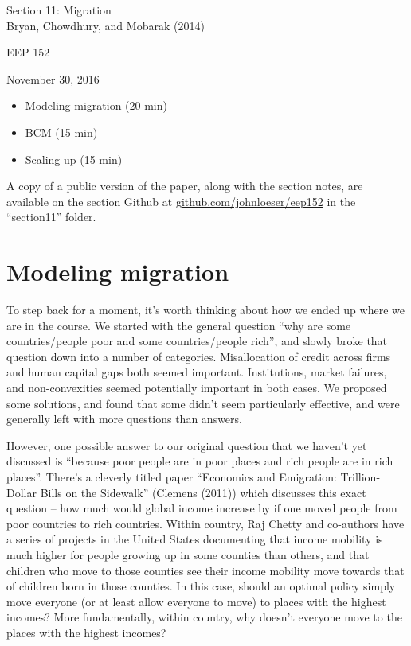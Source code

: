 \documentclass[12pt,english]{article}
\begin{document}
\begin{center}
{\Large{}Section 11: Migration} \\
{\large{}Bryan, Chowdhury, and Mobarak (2014)}
\par\end{center}{\Large \par}

\begin{center}
EEP 152
\par\end{center}

\begin{center}
November 30, 2016
\par\end{center}

\begin{itemize}
	\setlength\itemsep{-0.5em}
	\item Modeling migration (20 min)
	\item BCM (15 min)
	\item Scaling up (15 min)
\end{itemize}
A copy of a public version of the paper, along with the section notes, are available on the section Github at \href{github.com/johnloeser/eep152}{github.com/johnloeser/eep152} in the ``section11'' folder.

\section{Modeling migration}

To step back for a moment, it's worth thinking about how we ended up where we are in the course. We started with the general question ``why are some countries/people poor and some countries/people rich'', and slowly broke that question down into a number of categories. Misallocation of credit across firms and human capital gaps both seemed important. Institutions, market failures, and non-convexities seemed potentially important in both cases. We proposed some solutions, and found that some didn't seem particularly effective, and were generally left with more questions than answers.

However, one possible answer to our original question that we haven't yet discussed is ``because poor people are in poor places and rich people are in rich places''. There's a cleverly titled paper ``Economics and Emigration: Trillion-Dollar Bills on the Sidewalk'' (Clemens (2011)) which discusses this exact question -- how much would global income increase by if one moved people from poor countries to rich countries. Within country, Raj Chetty and co-authors have a series of projects in the United States documenting that income mobility is much higher for people growing up in some counties than others, and that children who move to those counties see their income mobility move towards that of children born in those counties. In this case, should an optimal policy simply move everyone (or at least allow everyone to move) to places with the highest incomes? More fundamentally, within country, why doesn't everyone move to the places with the highest incomes?
\end{document}
